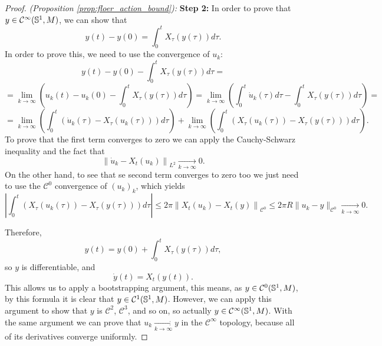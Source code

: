 \begin{proof} {\it (Proposition \ref{prop:floer_action_bound}):}
{\bf Step 2:} In order to prove that $y \in \mathcal{C}^{\infty}(\mathbb{S}^1,M)$, we can show that
\[y(t)-y(0) = \int_0^t X_{\tau}(y(\tau)) d\tau .\]
In order to prove this, we need to use the convergence of $u_k$:
\[y(t)-y(0)-\int_0^t X_{\tau}(y(\tau)) d\tau =\]
\[= \lim_{k\rightarrow\infty} \left( u_k(t) - u_k(0) - \int_0^t X_{\tau}(y(\tau)) d\tau \right) = \lim_{k\rightarrow\infty} \left( \int_0^t \dot{u}_k(\tau)d\tau - \int_0^t X_{\tau}(y(\tau)) d\tau \right) =\]
\[= \lim_{k\rightarrow\infty} \left( \int_0^t \left( \dot{u}_k(\tau) - X_{\tau}(u_k(\tau)) \right) d\tau \right) + \lim_{k\rightarrow\infty} \left( \int_0^t \left( X_{\tau}(u_k(\tau)) - X_{\tau}(y(\tau)) \right) d\tau \right) .\]
To prove that the first term converges to zero we can apply the Cauchy-Schwarz inequality and the fact that
\[\left\|\dot{u}_k - X_t(u_k)\right\|_{L^2} \xrightarrow[k\rightarrow\infty]{} 0.\]
On the other hand, to see that se second term converges to zero too we just need to use the $\mathcal{C}^0$ convergence of $(u_k)_k$, which yields
\[\left| \int_0^t \left( X_{\tau}(u_k(\tau)) - X_{\tau}(y(\tau)) \right) d\tau \right| \leq 2\pi \left\| X_t(u_k) - X_t(y) \right\|_{\mathcal{C}^0} \leq 2\pi R \| u_k - y \|_{\mathcal{C}^0} \xrightarrow[k\rightarrow\infty]{} 0 .\]

Therefore,
\[y(t) = y(0) + \int_0^t X_{\tau}(y(\tau)) d\tau ,\]
so $y$ is differentiable, and
\[\dot{y}(t) = X_t(y(t)) .\]
This allows us to apply a bootstrapping argument, this means, as $y \in \mathcal{C}^0(\mathbb{S}^1,M)$, by this formula it is clear that $y \in \mathcal{C}^1(\mathbb{S}^1,M)$. However, we can apply this argument to show that $y$ is $\mathcal{C}^2$, $\mathcal{C}^3$, and so on, so actually $y \in \mathcal{C}^{\infty}(\mathbb{S}^1,M)$. With the same argument we can prove that $u_k \xrightarrow[k\rightarrow\infty]{} y$ in the $\mathcal{C}^{\infty}$ topology, because all of its derivatives converge uniformly.


\end{proof}
